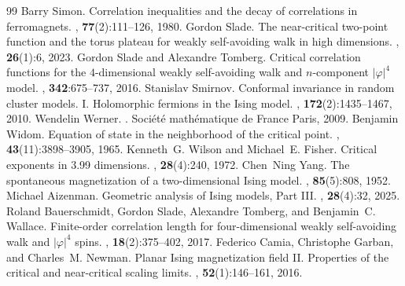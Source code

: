 \documentclass[10pt,a4paper]{amsart}
\numberwithin{equation}{section}
\begin{document}
\begin{thebibliography}{99}
 Barry Simon. \newblock Correlation inequalities and the decay of correlations in ferromagnets. , \textbf{77}(2):111--126, 1980.
 Gordon Slade. \newblock The near-critical two-point function and the torus plateau for weakly self-avoiding walk in high dimensions. , \textbf{26}(1):6, 2023.
 Gordon Slade and Alexandre Tomberg. \newblock Critical correlation functions for the $4$-dimensional weakly self-avoiding walk and $n$-component $|\varphi|^4$ model. , \textbf{342}:675--737, 2016.
 Stanislav Smirnov. \newblock Conformal invariance in random cluster models. {I}. {H}olomorphic fermions in the {I}sing model. , \textbf{172}(2):1435--1467, 2010.
 Wendelin Werner. . \newblock Société mathématique de France Paris, 2009.
 Benjamin Widom. \newblock Equation of state in the neighborhood of the critical point. , \textbf{43}(11):3898--3905, 1965.
 Kenneth~G. Wilson and Michael~E. Fisher. \newblock Critical exponents in 3.99 dimensions. , \textbf{28}(4):240, 1972.
 Chen~Ning Yang. \newblock The spontaneous magnetization of a two-dimensional {I}sing model. , \textbf{85}(5):808, 1952.
 Michael Aizenman. \newblock Geometric analysis of {I}sing models, {P}art {III}. , \textbf{28}(4):32, 2025.
 Roland Bauerschmidt, Gordon Slade, Alexandre Tomberg, and Benjamin~C. Wallace. \newblock Finite-order correlation length for four-dimensional weakly self-avoiding walk and $|\varphi|^4$ spins. , \textbf{18}(2):375--402, 2017.
 Federico Camia, Christophe Garban, and Charles~M. Newman. \newblock Planar {I}sing magnetization field {II}. {P}roperties of the critical and near-critical scaling limits. , \textbf{52}(1):146--161, 2016.

\end{thebibliography}
\end{document}
